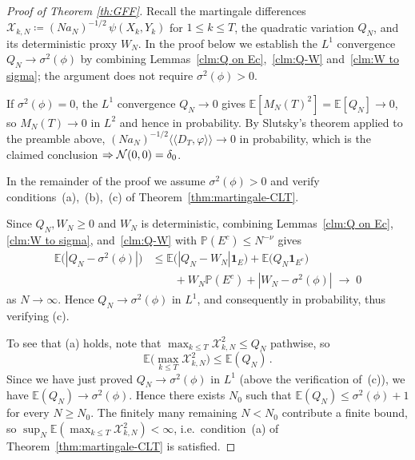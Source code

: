 \documentclass[11pt,a4paper,reqno]{amsart}
\theoremstyle{definition}
\newcommand{\cN}{\ensuremath{\mathcal N}}
\newcommand{\cX}{\ensuremath{\mathcal X}}
\newcommand{\bbE}{{\ensuremath{\mathbb E}} }
\newcommand{\bbP}{{\ensuremath{\mathbb P}} }
\newcommand{\laa}{\langle \! \langle}
\newcommand{\raa}{\rangle \! \rangle}
\begin{document}
\begin{proof}[Proof of Theorem \ref{th:GFF}]
Recall the martingale differences $\cX_{k,N} \coloneqq (Na_N)^{-1/2}\, \psi(X_k,Y_k)$ for $1 \leq k \leq T$, the quadratic variation $Q_N$, and its deterministic proxy $W_N$. In the proof below we establish the $L^1$ convergence $Q_N \to \sigma^2(\phi)$ by combining Lemmas~\ref{clm:Q on Ec},~\ref{clm:Q-W} and~\ref{clm:W to sigma}; the argument does not require $\sigma^2(\phi) > 0$.


If $\sigma^2(\phi) = 0$, the $L^1$ convergence $Q_N \to 0$ gives $\bbE[M_N(T)^2] = \bbE[Q_N] \to 0$, so $M_N(T) \to 0$ in $L^2$ and hence in probability. By Slutsky's theorem applied to the preamble above, $(Na_N)^{-1/2}\laa D_T, \varphi\raa \to 0$ in probability, which is the claimed conclusion $\Rightarrow \cN(0, 0) = \d_0$.

In the remainder of the proof we assume $\sigma^2(\phi) > 0$ and verify conditions~(a),~(b),~(c) of Theorem~\ref{thm:martingale-CLT}.

Since $Q_N, W_N \geq 0$ and $W_N$ is deterministic, combining Lemmas~\ref{clm:Q on Ec}, \ref{clm:W to sigma}, and~\ref{clm:Q-W} with $\bbP(E^c) \leq N^{-\nu}$ gives
\begin{align*}
\bbE\big( |Q_N - \sigma^2(\phi) | \big)
&\leq \bbE \big( |Q_N - W_N| \mathbf{1}_{E} \big) + \bbE\big( Q_N \mathbf{1}_{E^c} \big) \\
&\qquad + W_N \bbP(E^c) + |W_N - \sigma^2(\phi) |
\;\longrightarrow\; 0
\end{align*}
as $N \to \infty$.
Hence $Q_N \to \sigma^2(\phi)$ in $L^1$, and consequently in probability, thus verifying (c).

To see that (a) holds, note that $\max_{k \leq T} \cX_{k, N}^2 \leq Q_N$ pathwise, so
$$ \bbE \Big( \max_{k \leq T} \cX_{k,N}^2 \Big) \leq \bbE(Q_N)\,. $$
Since we have just proved $Q_N \to \sigma^2(\phi)$ in $L^1$ (above the verification of~(c)), we have $\bbE(Q_N) \to \sigma^2(\phi)$. Hence there exists $N_0$ such that $\bbE(Q_N) \leq \sigma^2(\phi) + 1$ for every $N \geq N_0$. The finitely many remaining $N < N_0$ contribute a finite bound, so $\sup_N \bbE(\max_{k \leq T} \cX_{k, N}^2) < \infty$, i.e.\ condition~(a) of Theorem~\ref{thm:martingale-CLT} is satisfied.


\end{proof}
\end{document}
